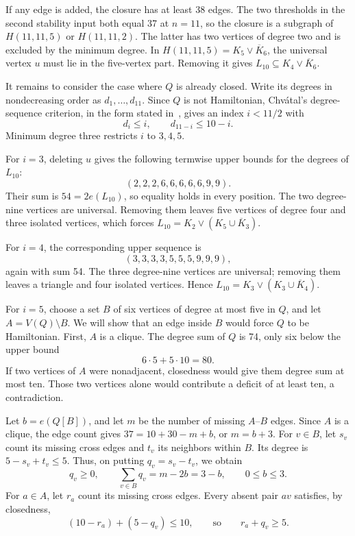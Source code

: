 \documentclass[12pt]{article}
\newcommand{\Ic}{\overline K}
\begin{document}
If any edge is added, the closure has at least 38 edges.
The two thresholds in the second stability input both equal
37 at $n=11$, so the closure is a subgraph of $H(11,11,5)$
or $H(11,11,2)$. The latter has two vertices of degree two
and is excluded by the minimum degree.
In $H(11,11,5)=K_5\vee\Ic_6$, the universal vertex $u$
must lie in the five-vertex part. Removing it gives
$L_{10}\subseteq K_4\vee\Ic_6$.

It remains to consider the case where $Q$ is already closed.
Write its degrees in nondecreasing order as
$d_1,\ldots,d_{11}$. Since $Q$ is not Hamiltonian,
Chv\'atal's degree-sequence criterion, in the form stated
in~\cite[Theorem~4.2]{fkvl}, gives an index $i<11/2$ with
\[
 d_i\leq i,\qquad d_{11-i}\leq10-i.
\]
Minimum degree three restricts $i$ to $3,4,5$.

For $i=3$, deleting $u$ gives the following termwise upper
bounds for the degrees of $L_{10}$:
\[
 (2,2,2,6,6,6,6,6,9,9).
\]
Their sum is $54=2e(L_{10})$, so equality holds in every
position. The two degree-nine vertices are universal.
Removing them leaves five vertices of degree four and three
isolated vertices, which forces
$L_{10}=K_2\vee(K_5\cup\Ic_3)$.

For $i=4$, the corresponding upper sequence is
\[
 (3,3,3,3,5,5,5,9,9,9),
\]
again with sum 54. The three degree-nine vertices are
universal; removing them leaves a triangle and four isolated
vertices. Hence $L_{10}=K_3\vee(K_3\cup\Ic_4)$.

For $i=5$, choose a set $B$ of six vertices of degree at most
five in $Q$, and let $A=V(Q)\setminus B$. We will show that
an edge inside $B$ would force $Q$ to be Hamiltonian.
First, $A$ is a clique. The degree sum of $Q$ is 74, only
six below the upper bound
\[
 6\cdot5+5\cdot10=80.
\]
If two vertices of $A$ were nonadjacent, closedness would
give them degree sum at most ten. Those two vertices alone
would contribute a deficit of at least ten, a contradiction.

Let $b=e(Q[B])$, and let $m$ be the number of missing
$A$--$B$ edges. Since $A$ is a clique, the edge count gives
$37=10+30-m+b$, or $m=b+3$.
For $v\in B$, let $s_v$ count its missing cross edges and
$t_v$ its neighbors within $B$. Its degree is
$5-s_v+t_v\leq5$. Thus, on putting $q_v=s_v-t_v$, we obtain
\[
 q_v\geq0,\qquad
 \sum_{v\in B}q_v=m-2b=3-b,\qquad 0\leq b\leq3.
\]
For $a\in A$, let $r_a$ count its missing cross edges.
Every absent pair $av$ satisfies, by closedness,
\begin{equation}\label{eq:closed-pair}
 (10-r_a)+(5-q_v)\leq10,
 \qquad\text{so}\qquad r_a+q_v\geq5.
\end{equation}
\end{document}
